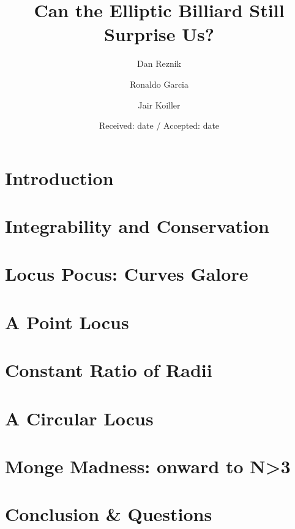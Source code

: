 \documentclass{svjour3}
\begin{document}
\title{Can the Elliptic Billiard Still Surprise Us?}
\author{Dan Reznik \and Ronaldo Garcia \and Jair Koiller}


\date{Received: date / Accepted: date}

\maketitle



\section{Introduction}
\label{sec:intro}


\section{Integrability and Conservation}
\label{sec:integrability}


\section{Locus Pocus: Curves Galore}
\label{sec:loci}


\section{A Point Locus}
\label{sec:mitten}


\section{Constant Ratio of Radii}
\label{sec:cosines}


\section{A Circular Locus}
\label{sec:circles}


\section{Monge Madness: onward to N{\textgreater}3}
\label{sec:generalize}


\section{Conclusion \& Questions}
\label{sec:conclusion}




 
 
\end{document}
